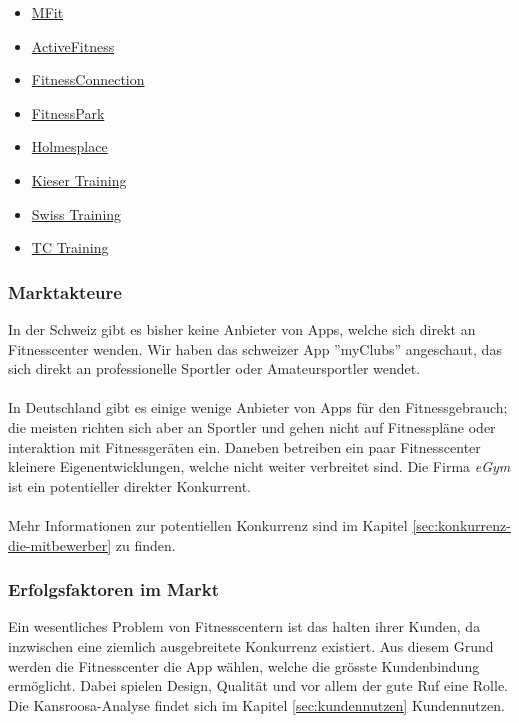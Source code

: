\begin{multicols}{2}
	\begin{itemize}
		\item \href{http://mfit.ch/}{MFit}
		\item \href{http://www.activfitness.ch/}{ActiveFitness}
		\item \href{http://fitnessconnection.ch/}{FitnessConnection}
		\item \href{http://www.fitnesspark.ch/}{FitnessPark}
		\item \href{http://holmesplace.ch/de/}{Holmesplace}
		\item \href{http://www.kieser-training.com/}{Kieser Training}
		\item \href{http://www.swiss-training.com/}{Swiss Training}
		\item \href{http://tc-training.ch/}{TC Training}
	\end{itemize}
\end{multicols}

\subsubsection{Marktakteure}
In der Schweiz gibt es bisher keine Anbieter von Apps, welche sich direkt an Fitnesscenter wenden. Wir haben das schweizer App ''myClubs'' angeschaut, das sich direkt an professionelle Sportler oder Amateursportler wendet.
\\ \\
In Deutschland gibt es einige wenige Anbieter von Apps für den Fitnessgebrauch; die meisten richten sich aber an Sportler und gehen nicht auf Fitnesspläne oder interaktion mit Fitnessgeräten ein. Daneben betreiben ein paar Fitnesscenter kleinere Eigenentwicklungen, welche nicht weiter verbreitet sind. Die Firma \emph{eGym} ist ein potentieller direkter Konkurrent.
\\ \\
Mehr Informationen zur potentiellen Konkurrenz sind im Kapitel \ref{sec:konkurrenz-die-mitbewerber} zu finden.


\subsubsection{Erfolgsfaktoren im Markt}

Ein wesentliches Problem von Fitnesscentern ist das halten ihrer Kunden, da inzwischen eine ziemlich ausgebreitete Konkurrenz existiert. Aus diesem Grund werden die Fitnesscenter die App wählen, welche die grösste Kundenbindung ermöglicht. Dabei spielen Design, Qualität und vor allem der gute Ruf eine Rolle. Die Kansroosa-Analyse findet sich im Kapitel \ref{sec:kundennutzen} Kundennutzen.

